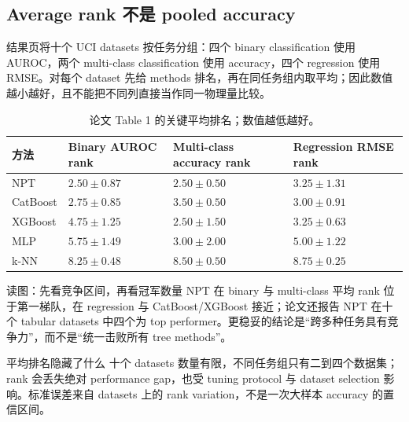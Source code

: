 \subsection{Average rank 不是 pooled accuracy}

结果页将十个 UCI datasets 按任务分组：四个 binary classification 使用 AUROC，两个 multi-class classification 使用 accuracy，四个 regression 使用 RMSE。对每个 dataset 先给 methods 排名，再在同任务组内取平均；因此数值越小越好，且不能把不同列直接当作同一物理量比较。


\begin{table}[H]
\centering
\small
\caption{论文 Table 1 的关键平均排名；数值越低越好。}
\begin{tabularx}{\textwidth}{L{0.22\textwidth}L{0.23\textwidth}L{0.23\textwidth}X}
\toprule
方法 & Binary AUROC rank & Multi-class accuracy rank & Regression RMSE rank \\
\midrule
NPT & $2.50\pm0.87$ & $2.50\pm0.50$ & $3.25\pm1.31$ \\
CatBoost & $2.75\pm0.85$ & $3.50\pm0.50$ & $3.00\pm0.91$ \\
XGBoost & $4.75\pm1.25$ & $2.50\pm1.50$ & $3.25\pm0.63$ \\
MLP & $5.75\pm1.49$ & $3.00\pm2.00$ & $5.00\pm1.22$ \\
k-NN & $8.25\pm0.48$ & $8.50\pm0.50$ & $8.75\pm0.25$ \\
\bottomrule
\end{tabularx}
\end{table}

\begin{knowledgebox}{读图：先看竞争区间，再看冠军数量}
NPT 在 binary 与 multi-class 平均 rank 位于第一梯队，在 regression 与 CatBoost/XGBoost 接近；论文还报告 NPT 在十个 tabular datasets 中四个为 top performer。更稳妥的结论是“跨多种任务具有竞争力”，而不是“统一击败所有 tree methods”。
\end{knowledgebox}

\begin{warningbox}{平均排名隐藏了什么}
十个 datasets 数量有限，不同任务组只有二到四个数据集；rank 会丢失绝对 performance gap，也受 tuning protocol 与 dataset selection 影响。标准误差来自 datasets 上的 rank variation，不是一次大样本 accuracy 的置信区间。
\end{warningbox}


